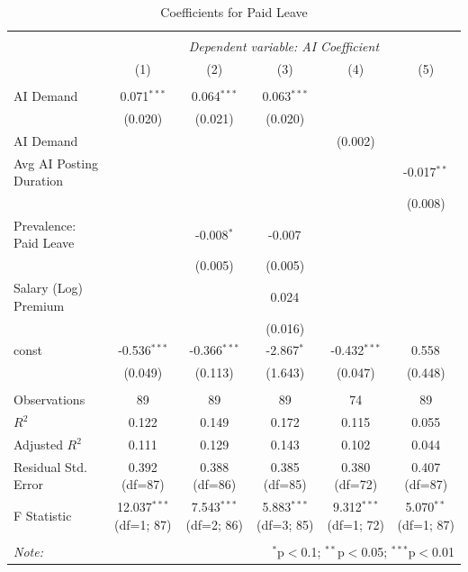 \begin{table}[!htbp] \centering
  \caption{Coefficients for Paid Leave}
\begin{tabular}{@{\extracolsep{5pt}}lccccc}
\\[-1.8ex]\hline
\hline \\[-1.8ex]
& \multicolumn{5}{c}{\textit{Dependent variable: AI Coefficient}} \
\cr \cline{2-6}
\\[-1.8ex] & (1) & (2) & (3) & (4) & (5) \\
\hline \\[-1.8ex]
 AI Demand & 0.071$^{***}$ & 0.064$^{***}$ & 0.063$^{***}$ & & \\
& (0.020) & (0.021) & (0.020) & & \\
 AI Demand %
& & & & (0.002) & \\
 Avg AI Posting Duration & & & & & -0.017$^{**}$ \\
& & & & & (0.008) \\
 Prevalence: Paid Leave & & -0.008$^{*}$ & -0.007$^{}$ & & \\
& & (0.005) & (0.005) & & \\
 Salary (Log) Premium & & & 0.024$^{}$ & & \\
& & & (0.016) & & \\
 const & -0.536$^{***}$ & -0.366$^{***}$ & -2.867$^{*}$ & -0.432$^{***}$ & 0.558$^{}$ \\
& (0.049) & (0.113) & (1.643) & (0.047) & (0.448) \\
\hline \\[-1.8ex]
 Observations & 89 & 89 & 89 & 74 & 89 \\
 $R^2$ & 0.122 & 0.149 & 0.172 & 0.115 & 0.055 \\
 Adjusted $R^2$ & 0.111 & 0.129 & 0.143 & 0.102 & 0.044 \\
 Residual Std. Error & 0.392 (df=87) & 0.388 (df=86) & 0.385 (df=85) & 0.380 (df=72) & 0.407 (df=87) \\
 F Statistic & 12.037$^{***}$ (df=1; 87) & 7.543$^{***}$ (df=2; 86) & 5.883$^{***}$ (df=3; 85) & 9.312$^{***}$ (df=1; 72) & 5.070$^{**}$ (df=1; 87) \\
\hline
\hline \\[-1.8ex]
\textit{Note:} & \multicolumn{5}{r}{$^{*}$p$<$0.1; $^{**}$p$<$0.05; $^{***}$p$<$0.01} \\
\end{tabular}
\end{table}